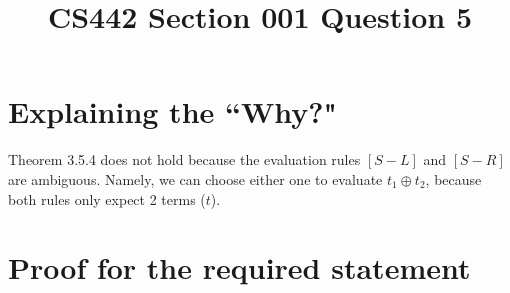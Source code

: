\documentclass[12pt]{article}
\title{CS442 Section 001 Question 5}
\begin{document}
\maketitle

\section{Explaining the ``Why?"}

Theorem 3.5.4 does not hold because the evaluation rules $[S-L]$ and $[S-R]$ are ambiguous.
Namely, we can choose either one to evaluate $t_1 \oplus t_2$, because both rules only expect 2 terms ($t$).

\section{Proof for the required statement}
\end{document}
